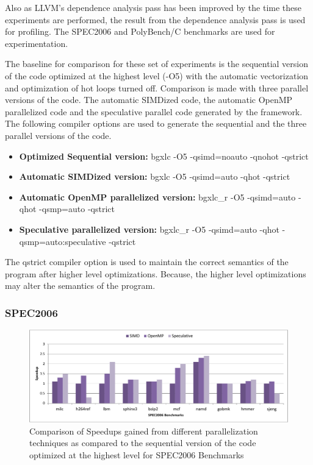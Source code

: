 \documentclass[10pt]{report}          %
\begin{document}
Also as LLVM's dependence analysis pass has been improved by the time these experiments are performed, the result from the dependence analysis pass is used for profiling.  The SPEC2006 and PolyBench/C benchmarks are used for experimentation.

The baseline for comparison for these set of experiments is the sequential version of the code optimized at the highest level (-O5) with the automatic vectorization and optimization of hot loops turned off.  Comparison is made with three parallel versions of the code.  The automatic SIMDized code, the automatic OpenMP parallelized code and the speculative parallel code generated by the framework.  The following compiler options are used to generate the sequential and the three parallel versions of the code. \\

\begin{itemize}
\item \textbf{Optimized Sequential version:} bgxlc -O5 -qsimd=noauto -qnohot -qstrict 
\item \textbf{Automatic SIMDized version:} bgxlc -O5 -qsimd=auto -qhot -qstrict 
\item \textbf{Automatic OpenMP parallelized version:} bgxlc\_r -O5 -qsimd=auto -qhot -qsmp=auto -qstrict 
\item \textbf{Speculative parallelized version:} bgxlc\_r -O5 -qsimd=auto -qhot -qsmp=auto:speculative -qstrict
\end{itemize}

The \-qstrict compiler option is used to maintain the correct semantics of the program after higher level optimizations.  Because, the higher level optimizations may alter the semantics of the program. \\

\subsubsection{SPEC2006}

\begin{figure}[h]
\centering
\includegraphics[scale=0.56]{./pdf/spec2006_O5.pdf}
\caption{Comparison of Speedups gained from different parallelization techniques as compared to the sequential version of the code optimized at the highest level for SPEC2006 Benchmarks }
\label{fig:speedup_O5}
\end{figure}
\end{document}
